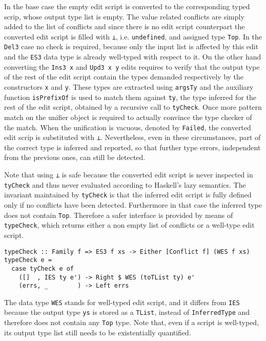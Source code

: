 \documentclass[../Thesis.tex]{subfiles}
\begin{document}
	In the base case the empty edit script is converted to the corresponding
	typed scrip, whose output type list is empty.
	The value related conflicts are simply added to the list of conflicts
	and since there is no edit script counterpart the converted edit script
	is filled with \texttt{⊥}, i.e. \texttt{undefined}, and assigned type 
	\texttt{Top}. In the \texttt{Del3} case no check is required, because
	only the input list is affected by this edit and the \texttt{ES3} data type is 
	already well-typed with respect to it.
	On the other hand converting the \texttt{Ins3 x} and \texttt{Upd3 x y} edits
	requires to verify that the output type of the rest of the edit script 
	contain the types demanded respectively by the constructors \texttt{x} and 
	\texttt{y}. These types are extracted using \texttt{argsTy} and the
	auxiliary function \texttt{isPrefixOf} is used to match them
	against \texttt{ty}, the type inferred for the rest of the edit script, obtained
	by a recursive call to \texttt{tyCheck}.
	Once more pattern match on the unifier object is required to actually
	convince the type checker of the match. When the unification is vacuous,
	denoted by \texttt{Failed}, the converted edit scrip is substituted with
	\texttt{⊥}. Nevertheless, even in these circumstances, part of the correct 
	type 	is inferred and reported, so that further type errors, independent
	from the previous ones, can still be detected.	
	
	Note that using \texttt{⊥} is safe because the converted edit script is 
	never inspected in \texttt{tyCheck} and thus never evaluated according to
	Haskell's lazy semantics.
	The invariant maintained by \texttt{tyCheck} is that the inferred edit
	script is fully defined only if no conflicts have been detected. Furthermore
	in that case the inferred type does not contain \texttt{Top}.
	Therefore a safer interface is provided by means of \texttt{typeCheck},
	which returns either a non empty list of conflicts or a well-type edit script.
	
\begin{verbatim}
typeCheck :: Family f => ES3 f xs -> Either [Conflict f] (WES f xs)
typeCheck e =
  case tyCheck e of
    ([]  , IES ty e') -> Right $ WES (toTList ty) e'
    (errs, _        ) -> Left errs
\end{verbatim}

	The data type \texttt{WES} stands for well-typed edit script, and it differs
	from \texttt{IES} because the output type \texttt{ys} is stored as a
	\texttt{TList}, instead of \texttt{InferredType} and therefore
	does not contain any \texttt{Top} type.
	Note that, even if a script is well-typed, its output type list still needs 
	to be existentially quantified.
	
\end{document}
